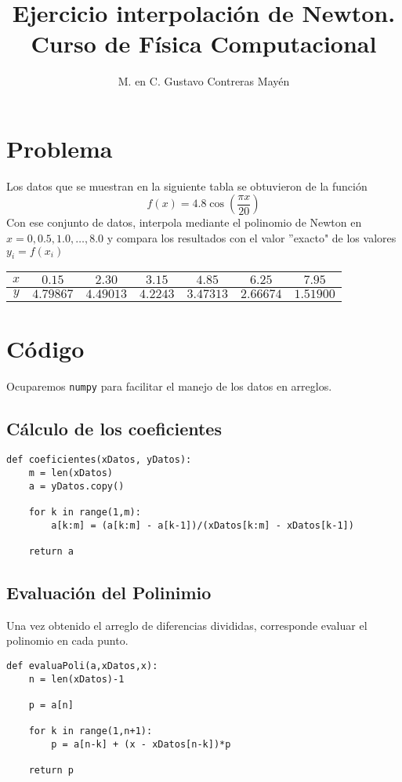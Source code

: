 \documentclass[11pt]{article}
\title{Ejercicio interpolaci\'{o}n de Newton. \\ Curso de Física Computacional}
\author{M. en C. Gustavo Contreras Mayén}
\date{ }
\begin{document}
\maketitle
\fontsize{14}{14}\selectfont
\section{Problema}
Los datos que se muestran en la siguiente tabla se obtuvieron de la funci\'{o}n
\[ f(x) = 4.8 \cos \left( \dfrac{\pi x}{20} \right)\]
Con ese conjunto de datos, interpola mediante el polinomio de Newton en $x=0, 0.5, 1.0, \ldots, 8.0$ y compara los resultados con el valor ''exacto" de los valores $y_{i} = f(x_{i})$
\begin{table}[htbp]
\centering \Large
\begin{tabulary}{15cm}{c | c | c | c | c | c | c}
$x$ & $0.15$ & $2.30$ & $3.15$ & $4.85$ & $6.25$ & $7.95$ \\
\midrule $y$ & $4.79867$ & $4.49013$ & $4.2243$ & $3.47313$ & $2.66674$ & $1.51900$
\end{tabulary}
\end{table}
\section{C\'{o}digo}
Ocuparemos \texttt{numpy} para facilitar el manejo de los datos en arreglos.
\subsection{C\'{a}lculo de los coeficientes}
\begin{lstlisting}
def coeficientes(xDatos, yDatos):
    m = len(xDatos)
    a = yDatos.copy()
    
    for k in range(1,m):
        a[k:m] = (a[k:m] - a[k-1])/(xDatos[k:m] - xDatos[k-1])
    
    return a
\end{lstlisting}
\subsection{Evaluaci\'{o}n del Polinimio}
Una vez obtenido el arreglo de diferencias divididas, corresponde evaluar el polinomio en cada punto.
\begin{lstlisting}
def evaluaPoli(a,xDatos,x):
    n = len(xDatos)-1
    
    p = a[n]
    
    for k in range(1,n+1):
        p = a[n-k] + (x - xDatos[n-k])*p
    
    return p
\end{lstlisting}
\end{document}
